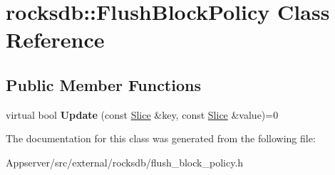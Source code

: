\hypertarget{classrocksdb_1_1FlushBlockPolicy}{}\section{rocksdb\+:\+:Flush\+Block\+Policy Class Reference}
\label{classrocksdb_1_1FlushBlockPolicy}
\subsection*{Public Member Functions}
\begin{DoxyCompactItemize}
\item 
virtual bool {\bfseries Update} (const \hyperlink{classrocksdb_1_1Slice}{Slice} \&key, const \hyperlink{classrocksdb_1_1Slice}{Slice} \&value)=0\hypertarget{classrocksdb_1_1FlushBlockPolicy_a12b20dcb03cadc7c43c8a29e8889fbea}{}\label{classrocksdb_1_1FlushBlockPolicy_a12b20dcb03cadc7c43c8a29e8889fbea}

\end{DoxyCompactItemize}


The documentation for this class was generated from the following file\+:\begin{DoxyCompactItemize}
\item 
Appserver/src/external/rocksdb/flush\+\_\+block\+\_\+policy.\+h\end{DoxyCompactItemize}
